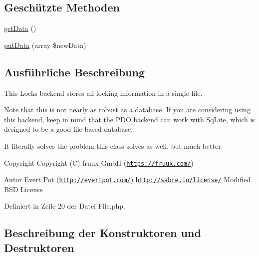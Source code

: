 \subsection*{Geschützte Methoden}
\begin{DoxyCompactItemize}
\item 
\mbox{\hyperlink{class_sabre_1_1_d_a_v_1_1_locks_1_1_backend_1_1_file_a42651c2f508b49093a9595f377bdb26c}{get\+Data}} ()
\item 
\mbox{\hyperlink{class_sabre_1_1_d_a_v_1_1_locks_1_1_backend_1_1_file_a2b6d397d5f333a9ab188becc86cb7dcf}{put\+Data}} (array \$new\+Data)
\end{DoxyCompactItemize}


\subsection{Ausführliche Beschreibung}
This Locks backend stores all locking information in a single file.

\mbox{\hyperlink{class_note}{Note}} that this is not nearly as robust as a database. If you are considering using this backend, keep in mind that the \mbox{\hyperlink{class_sabre_1_1_d_a_v_1_1_locks_1_1_backend_1_1_p_d_o}{P\+DO}} backend can work with Sq\+Lite, which is designed to be a good file-\/based database.

It literally solves the problem this class solves as well, but much better.

\begin{DoxyCopyright}{Copyright}
Copyright (C) fruux GmbH (\href{https://fruux.com/}{\tt https\+://fruux.\+com/}) 
\end{DoxyCopyright}
\begin{DoxyAuthor}{Autor}
Evert Pot (\href{http://evertpot.com/}{\tt http\+://evertpot.\+com/})  \href{http://sabre.io/license/}{\tt http\+://sabre.\+io/license/} Modified B\+SD License 
\end{DoxyAuthor}


Definiert in Zeile 20 der Datei File.\+php.



\subsection{Beschreibung der Konstruktoren und Destruktoren}
\mbox{\label{class_sabre_1_1_d_a_v_1_1_locks_1_1_backend_1_1_file_a58ea633649bd7512258e012b7b930d6d}} 
